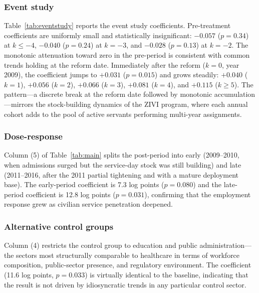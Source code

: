 \documentclass[12pt]{article}
\begin{document}
\subsubsection*{Event study} Table~\ref{tab:eventstudy} reports the event study coefficients. Pre-treatment coefficients are uniformly small and statistically insignificant: $-0.057$ ($p = 0.34$) at $k \leq -4$, $-0.040$ ($p = 0.24$) at $k = -3$, and $-0.028$ ($p = 0.13$) at $k = -2$. The monotonic attenuation toward zero in the pre-period is consistent with common trends holding at the reform date. Immediately after the reform ($k = 0$, year 2009), the coefficient jumps to $+0.031$ ($p = 0.015$) and grows steadily: $+0.040$ ($k = 1$), $+0.056$ ($k = 2$), $+0.066$ ($k = 3$), $+0.081$ ($k = 4$), and $+0.115$ ($k \geq 5$). The pattern---a discrete break at the reform date followed by monotonic accumulation---mirrors the stock-building dynamics of the ZIVI program, where each annual cohort adds to the pool of active servants performing multi-year assignments.

\subsubsection*{Dose-response} Column (5) of Table~\ref{tab:main} splits the post-period into early (2009--2010, when admissions surged but the service-day stock was still building) and late (2011--2016, after the 2011 partial tightening and with a mature deployment base). The early-period coefficient is 7.3 log points ($p = 0.080$) and the late-period coefficient is 12.8 log points ($p = 0.031$), confirming that the employment response grew as civilian service penetration deepened.

\subsubsection*{Alternative control groups} Column (4) restricts the control group to education and public administration---the sectors most structurally comparable to healthcare in terms of workforce composition, public-sector presence, and regulatory environment. The coefficient (11.6 log points, $p = 0.033$) is virtually identical to the baseline, indicating that the result is not driven by idiosyncratic trends in any particular control sector.



\end{document}
